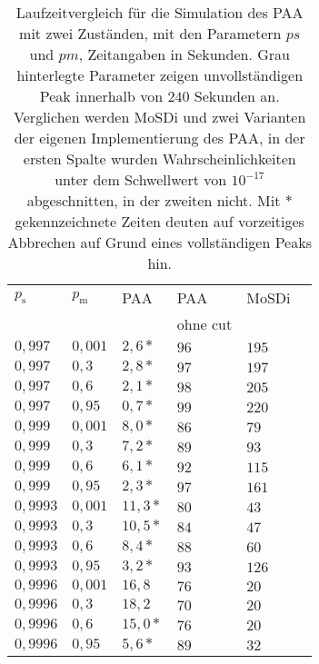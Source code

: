 \begin{table}[h]
\centering
\caption[Laufzeitvergleich für die Simulation des PAA mit zwei Zuständen]{Laufzeitvergleich für die Simulation des PAA mit zwei Zuständen, mit den Parametern $ps$ und $pm$, Zeitangaben in Sekunden. Grau hinterlegte Parameter zeigen unvollständigen Peak innerhalb von $240$ Sekunden an. Verglichen werden MoSDi und zwei Varianten der eigenen Implementierung des PAA, in der ersten Spalte wurden Wahrscheinlichkeiten unter dem Schwellwert von $10^{-17}$ abgeschnitten, in der zweiten nicht. Mit $*$ gekennzeichnete Zeiten deuten auf vorzeitiges Abbrechen auf Grund eines vollständigen Peaks hin.}
\label{2s_laufzeit_paa}
\begin{tabular}{|l|l||l|l|l|l|} \hline
$p_\text{s}$ & $p_\text{m}$  & PAA & PAA & MoSDi \\
& & & ohne cut & \\  \hline \hline
$0,997  $ & $ 0,001$ & $2,6*  $ & $96 $ & $ 195$ \\ \hline
$0,997  $ & $ 0,3  $ & $2,8*  $ & $97 $ & $ 197 $ \\ \hline
$0,997  $ & $ 0,6  $ & $2,1*  $ & $98 $ & $ 205 $ \\ \hline
$0,997  $ & $ 0,95 $ & $0,7*  $ & $99 $ & $ 220$ \\ \hline
$0,999  $ & $ 0,001$ & $8,0*  $ & $86 $ & $ 79$ \\ \hline
$0,999  $ & $ 0,3  $ & $7,2*  $ & $89 $ & $ 93$ \\ \hline
$0,999  $ & $ 0,6  $ & $6,1*  $ & $92 $ & $ 115$ \\ \hline
$0,999  $ & $ 0,95 $ & $2,3*  $ & $97 $ & $ 161$ \\ \hline
$0,9993 $ & $ 0,001$ & $11,3* $ & $80 $ & $ 43$ \\ \hline
$0,9993 $ & $ 0,3  $ & $10,5* $ & $84 $ & $ 47$ \\ \hline
$0,9993 $ & $ 0,6  $ & $8,4*  $ & $88 $ & $ 60$ \\ \hline
$0,9993 $ & $ 0,95 $ & $3,2*  $ & $93 $ & $ 126$ \\ \hline
\cellcolor{gray!25}$0,9996 $ &\cellcolor{gray!25} $ 0,001$ & $16,8 $ & $76 $ & $ 20$ \\ \hline
$0,9996 $ & $ 0,3  $ & $18,2 $ & $70 $ & $ 20$ \\ \hline
$0,9996 $ & $ 0,6  $ & $15,0* $ & $76 $ & $ 20$ \\ \hline
$0,9996 $ & $ 0,95 $ & $5,6*  $ & $89 $ & $ 32$ \\ \hline
\end{tabular}
\end{table}


